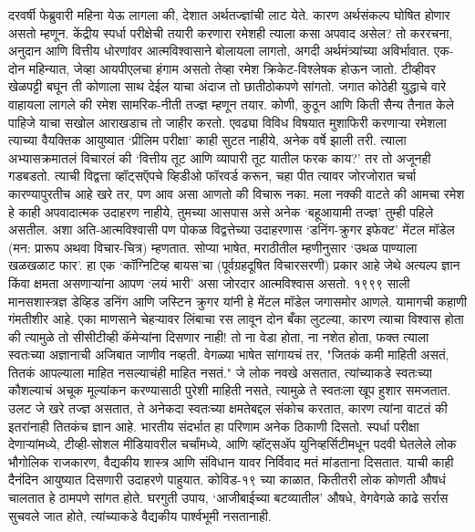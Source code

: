 दरवर्षी फेब्रुवारी महिना येऊ लागला की, देशात अर्थतज्ज्ञांची लाट येते. कारण अर्थसंकल्प घोषित होणार असतो म्हणून.  केंद्रीय स्पर्धा परीक्षेची तयारी करणारा रमेशही त्याला कसा अपवाद असेल? तो कररचना, अनुदान आणि वित्तीय धोरणांवर आत्मविश्वासाने बोलायला लागतो, अगदी अर्थमंत्र्यांच्या अविर्भावात. एक-दोन महिन्यात, जेव्हा आयपीएलचा हंगाम असतो तेव्हा रमेश क्रिकेट-विश्लेषक होऊन जातो. टीव्हीवर खेळपट्टी बघून ती कोणाला साथ देईल याचा अंदाज तो छातीठोकपणे सांगतो. जगात कोठेही युद्धाचे वारे वाहायला लागले की रमेश सामरिक-नीती तज्ज्ञ म्हणून तयार. कोणी, कुठून आणि किती सैन्य तैनात केले पाहिजे याचा सखोल आराखडाच तो जाहीर करतो. एवढ्या विविध विषयात मुशाफिरी करणाऱ्या रमेशला त्याच्या वैयक्तिक आयुष्यात ‘प्रीलिम परीक्षा’ काही सुटत नाहीये, अनेक वर्षे झाली तरी. त्याला अभ्यासक्रमातलं विचारलं की ‘वित्तीय तूट आणि व्यापारी तूट यातील फरक काय?’ तर तो अजूनही गडबडतो. त्याची विद्वत्ता व्हॉट्सऍपचे व्हिडीओ फॉरवर्ड करून, चहा पीत त्यावर जोरजोरात चर्चा कारण्यापुरतीच आहे खरे तर, पण आव असा आणतो की विचारू नका. मला नक्की वाटते की आमचा रमेश हे काही अपवादात्मक उदाहरण नाहीये, तुमच्या आसपास असे अनेक ‘बहूआयामी तज्ज्ञ’ तुम्ही पहिले असतील. अशा अति-आत्मविश्वासी पण पोकळ विद्वत्तेच्या उदाहरणास ‘डनिंग-क्रुगर इफेक्ट’ मेंटल मॉडेल (मन: प्रारूप अथवा विचार-चित्र) म्हणतात. सोप्या भाषेत, मराठीतील म्हणीनुसार ‘उथळ पाण्याला खळखळाट फार’. हा एक ‘कॉग्निटिव्ह बायस’चा (पूर्वग्रहदूषित विचारसरणी) प्रकार आहे जेथे अत्यल्प ज्ञान किंवा क्षमता असणाऱ्यांना आपण ‘लयं भारी’ असा जोरदार आत्मविश्वास असतो.
१९९९ साली मानसशास्त्रज्ञ डेव्हिड डनिंग आणि जस्टिन क्रुगर यांनी हे मेंटल मॉडेल जगासमोर आणले. यामागची कहाणी गंमतीशीर आहे.  एका माणसाने चेहऱ्यावर लिंबाचा रस लावून दोन बँका लुटल्या, कारण त्याचा विश्वास होता की त्यामुळे तो सीसीटीव्ही कॅमेर्‍यांना दिसणार नाही! तो ना वेडा होता, ना नशेत होता, फक्त त्याला स्वतःच्या अज्ञानाची अजिबात जाणीव नव्हती. वेगळ्या भाषेत सांगायचं तर, "जितकं कमी माहिती असतं, तितकं आपल्याला माहित नसल्याचंही माहित नसतं." जे लोक नवखे असतात, त्यांच्याकडे स्वतःच्या कौशल्याचं अचूक मूल्यांकन करण्यासाठी पुरेशी माहिती नसते, त्यामुळे ते स्वतःला खूप हुशार समजतात. उलट जे खरे तज्ज्ञ असतात, ते अनेकदा स्वतःच्या क्षमतेबद्दल संकोच करतात, कारण त्यांना वाटतं की इतरांनाही तितकंच ज्ञान आहे.
भारतीय संदर्भात हा परिणाम अनेक ठिकाणी दिसतो. स्पर्धा परीक्षा देणाऱ्यांमध्ये, टीव्ही-सोशल मीडियावरील चर्चांमध्ये, आणि व्हॉट्सअ‍ॅप युनिव्हर्सिटीमधून पदवी घेतलेले लोक भौगोलिक राजकारण, वैद्यकीय शास्त्र आणि संविधान यावर निर्विवाद मतं मांडताना दिसतात. याची काही दैनंदिन आयुष्यात दिसणारी उदाहरणे पाहुयात. 
कोविड-१९ च्या काळात, कितीतरी लोक कोणती औषधं चालतात हे ठामपणे सांगत होते. घरगुती उपाय, ‘आजीबाईच्या बटव्यातील’ औषधे, वेगवेगळे काढे सर्रास सुचवले जात होते, त्यांच्याकडे वैद्यकीय पार्श्वभूमी नसतानाही. 
